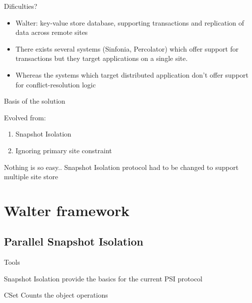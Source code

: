 \documentclass{beamer}
\begin{document}
		\begin{frame}{Dificulties?}
		
		\begin{itemize}
		\item Walter: key-value store database, supporting transactions and replication of data across remote sites
		\item There exists several systems (Sinfonia, Percolator) which offer support for transactions but they target applications on a single site. 
		\item Whereas the systems which target distributed application don't offer support for conflict-resolution logic
		\end{itemize}
		
		\end{frame}		
	
		\begin{frame}{Basis of the solution}

			Evolved from:
			\begin{enumerate}
			\item Snapshot Isolation
			\item Ignoring primary site constraint
			\end{enumerate}

			\begin{alertblock}{Nothing is so easy..}
				Snapshot Isolation protocol had to be changed to support multiple site store
			\end{alertblock}
						
		\end{frame}		

\section{Walter framework}

	\subsection{Parallel Snapshot Isolation}
		\begin{frame}{Tools}
		
		
			Snapshot Isolation provide the basics for the current PSI protocol
			
			CSet Counts the object operations
		
		\end{frame}
		
\end{document}
